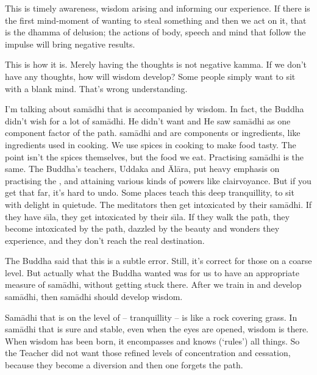 This is timely awareness, wisdom arising and informing our experience. If there is the first mind-moment of wanting to steal something and then we act on it, that is the dhamma of delusion; the actions of body, speech and mind that follow the impulse will bring negative results. 

This is how it is. Merely having the thoughts is not negative kamma. If we don't have any thoughts, how will wisdom develop? Some people simply want to sit with a blank mind. That's wrong understanding. 

I'm talking about sam\=adhi that is accompanied by wisdom. In fact, the Buddha didn't wish for a lot of sam\=adhi. He didn't want  and  He saw sam\=adhi as one component factor of the path.  sam\=adhi and  are components or ingredients, like ingredients used in cooking. We use spices in cooking to make food tasty. The point isn't the spices themselves, but the food we eat. Practising sam\=adhi is the same. The Buddha's teachers, Uddaka and \=Al\=ara, put heavy emphasis on practising the , and attaining various kinds of powers like clairvoyance. But if you get that far, it's hard to undo. Some places teach this deep tranquillity, to sit with delight in quietude. The meditators then get intoxicated by their sam\=adhi. If they have s\={\i}la, they get intoxicated by their s\={\i}la. If they walk the path, they become intoxicated by the path, dazzled by the beauty and wonders they experience, and they don't reach the real destination. 

The Buddha said that this is a subtle error. Still, it's correct for those on a coarse level. But actually what the Buddha wanted was for us to have an appropriate measure of sam\=adhi, without getting stuck there. After we train in and develop sam\=adhi, then sam\=adhi should develop wisdom. 

Sam\=adhi that is on the level of  -- tranquillity -- is like a rock covering grass. In sam\=adhi that is sure and stable, even when the eyes are opened, wisdom is there. When wisdom has been born, it encompasses and knows (`rules') all things. So the Teacher did not want those refined levels of concentration and cessation, because they become a diversion and then one forgets the path. 

